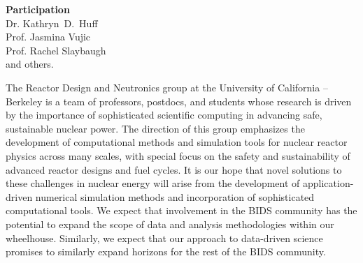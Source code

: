 \documentclass[a4paper, 12pt]{article}
\newcommand{\authorname}{Reactor Design and Neutronics Group}
\newcommand{\longauthorname}{Dr. Kathryn~D.~Huff\\ Prof. Jasmina Vujic\\ Prof. 
Rachel Slaybaugh\\ and others.}
\newcommand{\authorsite}{ucb-rdn.github.com}
\begin{document}
\pagestyle{fancy}
\lhead{\textcolor{gray}{\it \authorname}}
\rhead{\textcolor{gray}{\thepage/\totalpages{}}}
\renewcommand{\headrulewidth}{0pt} 
\renewcommand{\footrulewidth}{0pt} 
\fancyfoot[C]{\footnotesize \textcolor{gray}{\authorsite}} 

\begin{center}
{\LARGE \bf Participation}\\
\vspace*{0.1cm}
{\normalsize \longauthorname}
\end{center}




The Reactor Design and Neutronics group at the University of California -- 
Berkeley \cite{reactor_ucb-rdn_2014} is a team of professors, postdocs, and 
students whose research is driven by the importance of sophisticated scientific 
computing in advancing safe, sustainable nuclear power.  
The direction of this group emphasizes the development of computational methods 
and simulation tools for nuclear reactor physics across many scales, with 
special focus on the safety and sustainability of advanced reactor designs and 
fuel cycles.  
It is our hope that novel solutions to these challenges in nuclear 
energy will arise from the development of application-driven numerical 
simulation methods and incorporation of sophisticated computational tools.  
We expect that involvement in the BIDS community has the potential to expand the 
scope of data and analysis methodologies within our wheelhouse. Similarly, we 
expect that our approach to data-driven science promises to similarly expand 
horizons for the rest of the BIDS community.
\end{document}
